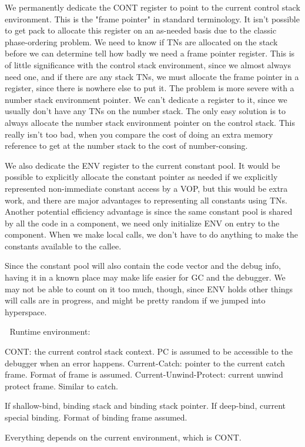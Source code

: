 {\begin{itemize, spread 0, spacing 1}
We permanently dedicate the CONT register to point to the current control stack
environment.  This is the "frame pointer" in standard terminology.  It isn't
possible to get pack to allocate this register on an as-needed basis due to the
classic phase-ordering problem.  We need to know if TNs are allocated on the
stack before we can determine tell how badly we need a frame pointer register.
This is of little significance with the control stack environment, since we
almost always need one, and if there are any stack TNs, we must allocate the
frame pointer in a register, since there is nowhere else to put it.  The
problem is more severe with a number stack environment pointer.  We can't
dedicate a register to it, since we usually don't have any TNs on the number
stack.  The only easy solution is to always allocate the number stack
environment pointer on the control stack.  This really isn't too bad, when you
compare the cost of doing an extra memory reference to get at the number stack
to the cost of number-consing.

We also dedicate the ENV register to the current constant pool.  It would be
possible to explicitly allocate the constant pointer as needed if we explicitly
represented non-immediate constant access by a VOP, but this would be extra
work, and there are major advantages to representing all constants using TNs.
Another potential efficiency advantage is since the same constant pool is
shared by all the code in a component, we need only initialize ENV on entry to
the component.  When we make local calls, we don't have to do anything to make
the constants available to the callee.

Since the constant pool will also contain the code vector and the debug info,
having it in a known place may make life easier for GC and the debugger.  We
may not be able to count on it too much, though, since ENV holds other things
will calls are in progress, and might be pretty random if we jumped into
hyperspace.


Runtime environment:

CONT: the current control stack context.
PC is assumed to be accessible to the debugger when an error happens.
Current-Catch: pointer to the current catch frame.  Format of frame is assumed.
Current-Unwind-Protect: current unwind protect frame.  Similar to catch.

If shallow-bind, binding stack and binding stack pointer.
If deep-bind, current special binding.  Format of binding frame assumed.

Everything depends on the current environment, which is CONT.


\end{itemize, spread 0, spacing 1}}

